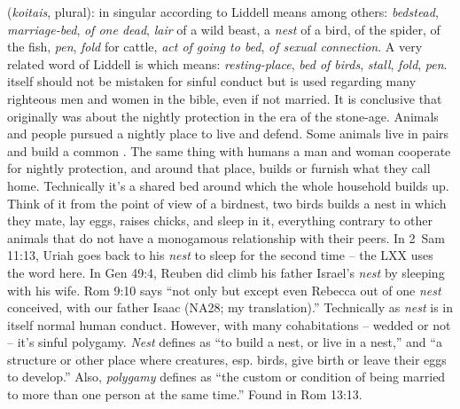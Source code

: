 \item[Nests (multiple),]

(\textit{koitais}, plural):
 in singular according to Liddell means among others: \emph{bedstead}, \emph{marriage-bed}, \emph{of one dead}, \emph{lair} of a wild beast, a \emph{nest} of a bird, of the spider, of the fish, \emph{pen}, \emph{fold} for cattle, \emph{act of going to bed}, \emph{of sexual connection}. A very related word of Liddell is  which means: \emph{resting-place}, \emph{bed of birds}, \emph{stall}, \emph{fold}, \emph{pen}. 
 itself should not be mistaken for sinful conduct but is used regarding many righteous men and women in the bible, even if not married. It is conclusive that  originally was about the nightly protection in the era of the stone-age. Animals and people pursued a nightly place to live and defend. Some animals live in pairs and build a common . The same thing with humans a man and woman cooperate for nightly protection, and around that place, builds or furnish what they call home. 
Technically it's a shared bed around which the whole household builds up. Think of it from the point of view of a birdnest, two birds builds a nest in which they mate, lay eggs, raises chicks, and sleep in it, everything contrary to other animals that do not have a monogamous relationship with their peers. 
In 2~Sam 11:13, Uriah goes back to his \emph{nest} to sleep for the second time -- the LXX uses the word  here. 
In Gen 49:4, Reuben did climb his father Israel's \emph{nest} by sleeping with his wife. 
 Rom 9:10 says ``not only but except even Rebecca out of one \emph{nest} conceived, with our father Isaac (NA28; my translation).'' Technically  as \emph{nest} is in itself normal human conduct. However, with many cohabitations -- wedded or not -- it's sinful polygamy. \emph{Nest} defines as ``to build a nest, or live in a nest,'' and ``a structure or other place where creatures, esp. birds, give birth or leave their eggs to develop.'' Also, \emph{polygamy} defines as ``the custom or condition of being married to more than one person at the same time.''
Found in Rom 13:13.
